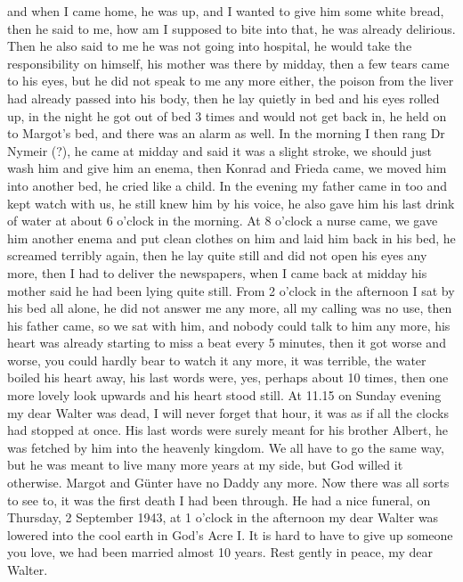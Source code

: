 \documentclass[a5paper,11pt,openany]{book}
\newcommand{\seite}[1]{\leavevmode\marginpar{\footnotesize\itshape\raggedright #1}\ignorespaces}
\begin{document}
  and when I came home, he was up, and I wanted to give him some white bread,
  then he said to me, how am I supposed to bite into that, he was already delirious.
Then he also said to me he was not going into hospital, he would take the responsibility on himself,
  his mother was there by midday, then a few tears came to his eyes,
  but he did not speak to me any more either, the poison from the liver had already
\seite{64}
passed into his body, then he lay quietly in bed and his eyes rolled up,
  in the night he got out of bed 3 times and would not get back in,
  he held on to Margot's bed, and there was an alarm as well.
In the morning I then rang Dr Nymeir (?), he came at midday and said it was a slight stroke,
  we should just wash him and give him an enema,
  then Konrad and Frieda came, we moved him into another bed, he cried
\seite{65}
like a child.
In the evening my father came in too and kept watch with us, he still knew him by his voice,
  he also gave him his last drink of water at about 6 o'clock in the morning.
At 8 o'clock a nurse came,
  we gave him another enema and put clean clothes on him and laid him back in his bed,
  he screamed terribly again, then he lay quite still and did not open his eyes any more,
\seite{66}
then I had to deliver the newspapers, when I came back at midday his mother said he had been lying quite still.
From 2 o'clock in the afternoon I sat by his bed all alone, he did not answer me any more,
  all my calling was no use, then his father came, so we sat with him, and nobody could talk to him any more,
  his heart was already starting to miss a beat every 5 minutes, then it got worse and worse, you could hardly bear
\seite{67}
to watch it any more, it was terrible,
  the water boiled his heart away, his last words were, yes, perhaps about 10 times,
  then one more lovely look upwards and his heart stood still.
At 11.15 on Sunday evening my dear Walter was dead, I will never forget that hour,
  it was as if all the clocks had stopped at once.
His last words were surely meant for his brother Albert, he was fetched by him into the heavenly kingdom.
We all have to
\seite{68}
go the same way, but he was meant to live many more years at my side, but God willed it otherwise.
Margot and Günter have no Daddy any more.
Now there was all sorts to see to,
  it was the first death I had been through.
He had a nice funeral, on Thursday, 2 September 1943, at 1 o'clock in the afternoon
  my dear Walter was lowered into the cool earth in God's Acre I.
It is hard to have to give up someone you love, we had been married almost 10 years.
Rest gently in peace, my dear Walter.
\end{document}
